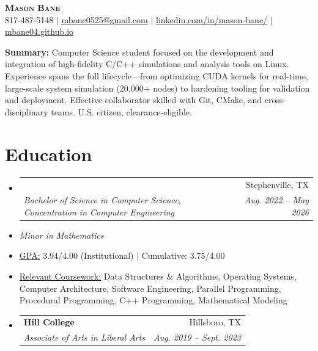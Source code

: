 \documentclass[letterpaper,11pt]{article}
\makeatletter
\newcommand{\educationDetail}[1]{%
  \vspace{-4pt}\item[]\small{#1}\vspace{-2pt}%
}
\newcommand{\resumeSubheading}[4]{
  \vspace{-2pt}\item
    \begin{tabular*}{0.97\textwidth}[t]{l@{\extracolsep{\fill}}r}
      \textbf{#1} & #2 \\
      \textit{\small#3} & \textit{\small #4} \\
    \end{tabular*}\vspace{-7pt}
}
\newcommand{\resumeSubHeadingListStart}{\begin{itemize}[leftmargin=0.15in, label={}]}
\newcommand{\resumeSubHeadingListEnd}{\end{itemize}}
\makeatother
\begin{document}

\begin{center}
    \textbf{\Huge \scshape Mason Bane} \\ \vspace{1pt}
    \small 817-487-5148 $|$ \href{mailto:mbane0525@gmail.com}{\underline{mbane0525@gmail.com}} $|$ 
    \href{https://www.linkedin.com/in/mason-bane/}{\underline{linkedin.com/in/mason-bane/}} $|$
    \href{https://mbane04.github.io}{\underline{mbane04.github.io}}
\end{center}


\vspace{-2pt}
\textbf{Summary:} Computer Science student focused on the development and integration of high-fidelity C/C++ simulations and analysis tools on Linux. Experience spans the full lifecycle—from optimizing CUDA kernels for real-time, large-scale system simulation (20,000+ nodes) to hardening tooling for validation and deployment. Effective collaborator skilled with Git, CMake, and cross-disciplinary teams. U.S. citizen, clearance-eligible.
\vspace{-10pt}

\section{Education}
  \resumeSubHeadingListStart
    \resumeSubheading
      {Tarleton State University \textnormal}{Stephenville, TX}
      {Bachelor of Science in Computer Science, Concentration in Computer Engineering}
      {Aug. 2022 -- May 2026}
      \vspace{-1pt}
      \educationDetail{\textit{Minor in Mathematics}}
      \educationDetail{\underline{GPA:} 3.94/4.00 (Institutional) | Cumulative: 3.75/4.00}
      \educationDetail{\underline{Relevant Coursework:} Data Structures \& Algorithms, Operating Systems, Computer Architecture, Software Engineering, Parallel Programming, Procedural Programming, C++ Programming, Mathematical Modeling}
   \resumeSubheading
      {Hill College}{Hillsboro, TX}
      {Associate of Arts in Liberal Arts}{Aug. 2019 -- Sept. 2023}
  \resumeSubHeadingListEnd
  \vspace{-13pt}
\end{document}
